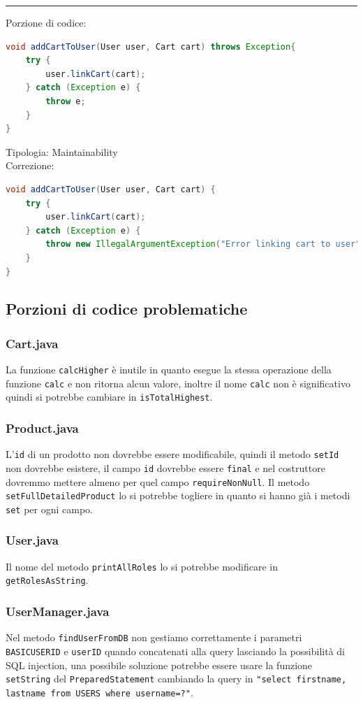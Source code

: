 \documentclass{article}
\begin{document}
\vspace{.5em}\hrule\vspace{.5em}
Porzione di codice:
\begin{lstlisting}[language=Java]
void addCartToUser(User user, Cart cart) throws Exception{
    try {
        user.linkCart(cart);
    } catch (Exception e) {
        throw e;
    }
}
\end{lstlisting}
Tipologia: Maintainability\\
Correzione:
\begin{lstlisting}[language=Java]
void addCartToUser(User user, Cart cart) {
    try {
        user.linkCart(cart);
    } catch (Exception e) {
        throw new IllegalArgumentException("Error linking cart to user", e);
    }
}
\end{lstlisting}
\subsection{Porzioni di codice problematiche}
\subsubsection{Cart.java}
La funzione \texttt{calcHigher} è inutile in quanto esegue la stessa operazione della funzione \texttt{calc} e non ritorna alcun valore, inoltre il nome \texttt{calc} non è significativo quindi si potrebbe cambiare in \texttt{isTotalHighest}.
\subsubsection{Product.java}
L'\texttt{id} di un prodotto non dovrebbe essere modificabile, quindi il metodo \texttt{setId} non dovrebbe esistere, il campo \texttt{id} dovrebbe essere \texttt{final} e nel costruttore dovremmo mettere almeno per quel campo \texttt{requireNonNull}. Il metodo \texttt{setFullDetailedProduct} lo si potrebbe togliere in quanto si hanno già i metodi \texttt{set} per ogni campo.
\subsubsection{User.java}
Il nome del metodo \texttt{printAllRoles} lo si potrebbe modificare in \texttt{getRolesAsString}.
\subsubsection{UserManager.java}
Nel metodo \texttt{findUserFromDB} non gestiamo correttamente i parametri \texttt{BASICUSERID} e \texttt{userID} quando concatenati alla query lasciando la possibilità di SQL injection, una possibile soluzione potrebbe essere usare la funzione \texttt{setString} del \texttt{PreparedStatement} cambiando la query in \texttt{"select firstname, lastname from USERS where username=?"}.
\end{document}
